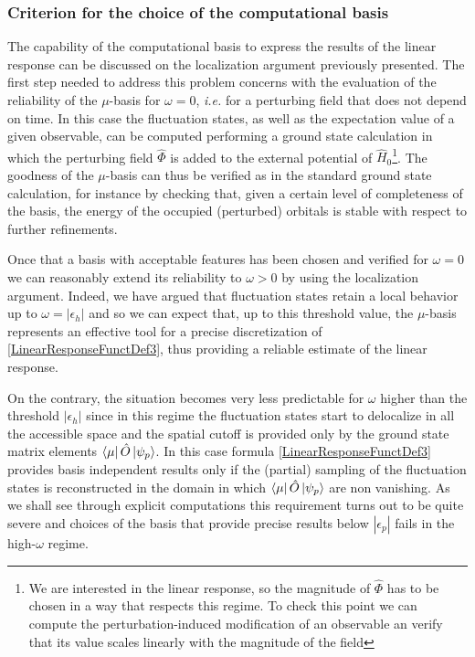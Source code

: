 \documentclass[a4paper]{article}
\newcommand{\eps}{\epsilon}
\newcommand{\op}[1]{\hat {#1}}
\newcommand{\hnot}{\op{H}_0}
\begin{document}
\subsubsection{Criterion for the choice of the computational basis} %

The capability of the computational basis to express the results of the linear response can be discussed on the localization argument previously presented. 
The first step needed to address this problem concerns with the evaluation of the reliability of the $\mu$-basis for $\omega=0$, \emph{i.e.} for a perturbing field that does 
not depend on time. In this case the fluctuation states, as well as the expectation value of a given observable, can be computed performing a ground state calculation in which the perturbing 
field $\op\Phi$ is added to the external potential of $\hnot$\footnote{We are interested in the linear response, so the magnitude of $\op\Phi$ has to be chosen in a way that respects this 
regime. To check this point we can compute the perturbation-induced modification of an observable an verify that its value scales linearly with the magnitude of the field}. 
The goodness of the $\mu$-basis can thus be verified as in the standard ground state calculation, for instance by checking that, given a certain level of completeness of the basis,
the energy of the occupied (perturbed) orbitals is stable with respect to further refinements. 

Once that a basis with acceptable features has been chosen and verified for $\omega=0$ we can reasonably extend its reliability to $\omega>0$ by using the localization argument. 
Indeed, we have argued that fluctuation states retain a local behavior up to $\omega=|\eps_h|$ and so we can expect that, up to this threshold value, the $\mu$-basis represents an 
effective tool for a precise discretization of \eqref{LinearResponseFunctDef3}, thus providing a reliable estimate of the linear response.  

On the contrary, the situation becomes very less predictable for $\omega$ higher than the threshold $|\eps_h|$ since in this regime the fluctuation states start to delocalize in all the 
accessible space and the spatial cutoff is provided only by the ground state matrix elements $\bra{\mu}\op O\ket{\psi_p}$.  
In this case formula \eqref{LinearResponseFunctDef3} provides basis independent results only if the (partial) sampling of the fluctuation states is reconstructed in the domain in which
$\bra{\mu}\op O\ket{\psi_p}$ are non vanishing. As we shall see through explicit computations this requirement turns out to be quite severe and choices of the basis that provide precise
results below $|\eps_p|$ fails in the high-$\omega$ regime.  
\end{document}
